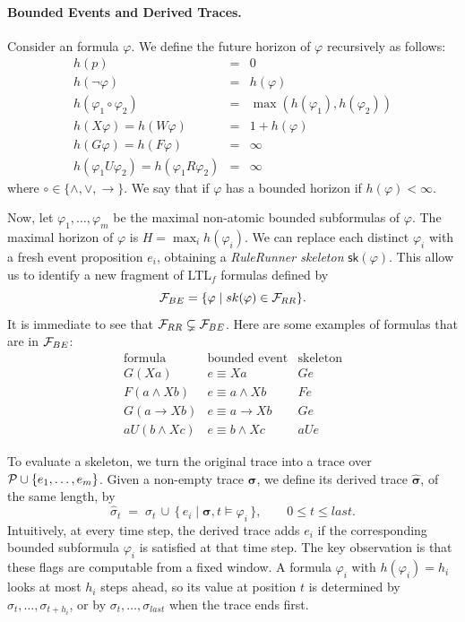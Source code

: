 \paragraph{Bounded Events and Derived Traces.}

Consider an \ltlf formula $\varphi$. We define the future horizon of $\varphi$ recursively as follows:
\[
\begin{array}{rcl}
h(p)&=&0\\
h(\neg\varphi)&=&h(\varphi)\\
h(\varphi_1\circ\varphi_2)&=&\max(h(\varphi_1),h(\varphi_2))\\
h(X\varphi)=h(W\varphi)&=&1+h(\varphi)\\
h(G\varphi)=h(F\varphi)&=&\infty\\
h(\varphi_1 U \varphi_2)=h(\varphi_1 R \varphi_2)&=&\infty
\end{array}
\]
where $\circ\in\{\land,\lor,\to\}$. We say that if $\varphi$ has a bounded horizon if $h(\varphi) < \infty$.

Now, let $\varphi_1,\ldots,\varphi_m$ be the maximal non-atomic bounded subformulas of $\varphi$. The maximal horizon of $\varphi$ is $H=\max_i h(\varphi_i)$. We can replace each distinct $\varphi_i$ with a fresh event proposition $e_i$, obtaining a \emph{RuleRunner skeleton} $\mathsf{sk}(\varphi)$. This allow us to identify a new fragment of LTL$_f$ formulas defined by
\[
{\mathcal{F}}_{BE} = \{\varphi \mid sk(\varphi)\in{\ensuremath{\mathcal{F}}}_{RR}\}.
\]
It is immediate to see that ${\mathcal{F}}_{RR} \subsetneq {\ensuremath{\mathcal{F}}}_{BE}$. Here are some examples of formulas that are in ${\mathcal{F}}_{BE}$:
\[
\begin{array}{c|c|c}
\text{formula} & \text{bounded event} & \text{skeleton}\\ \hline
G(Xa) & e\equiv Xa & Ge\\
F(a\land Xb) & e\equiv a\land Xb & Fe\\
G(a\to Xb) & e\equiv a\to Xb & Ge\\
a U (b\land Xc) & e\equiv b\land Xc & a U e
\end{array}
\]

To evaluate a skeleton, we turn the original trace into a trace over ${\mathcal{P}}\cup\{e_1,\ldots,e_m\}$. Given a non-empty trace $\boldsymbol{\sigma}$, we define its derived trace $\widehat{\boldsymbol{\sigma}}$, of the same length, by
\[
\hat{\sigma}_t \;=\; \sigma_t \,\cup\, \{\,e_i \mid \boldsymbol{\sigma},t\models\varphi_i\,\},
\qquad 0\leq t\leq last.
\]
Intuitively, at every time step, the derived trace adds $e_i$ if the corresponding bounded subformula $\varphi_i$ is satisfied at that time step. The key observation is that these flags are computable from a fixed window. A formula $\varphi_i$ with $h(\varphi_i)=h_i$ looks at most $h_i$ steps ahead, so its value at position $t$ is determined by $\sigma_t,\ldots,\sigma_{t+h_i}$, or by $\sigma_t,\ldots,\sigma_{last}$ when the trace ends first. 

